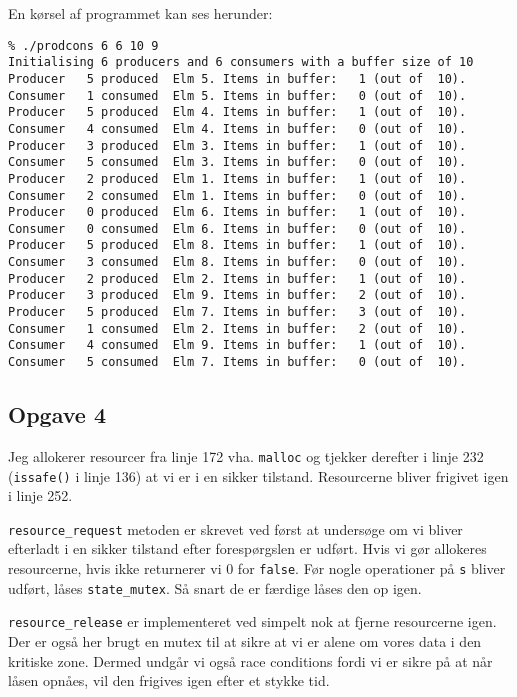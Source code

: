 \documentclass{article}
\begin{document}
En kørsel af programmet kan ses herunder:
\begin{verbatim}
% ./prodcons 6 6 10 9 
Initialising 6 producers and 6 consumers with a buffer size of 10
Producer   5 produced  Elm 5. Items in buffer:   1 (out of  10).
Consumer   1 consumed  Elm 5. Items in buffer:   0 (out of  10).
Producer   5 produced  Elm 4. Items in buffer:   1 (out of  10).
Consumer   4 consumed  Elm 4. Items in buffer:   0 (out of  10).
Producer   3 produced  Elm 3. Items in buffer:   1 (out of  10).
Consumer   5 consumed  Elm 3. Items in buffer:   0 (out of  10).
Producer   2 produced  Elm 1. Items in buffer:   1 (out of  10).
Consumer   2 consumed  Elm 1. Items in buffer:   0 (out of  10).
Producer   0 produced  Elm 6. Items in buffer:   1 (out of  10).
Consumer   0 consumed  Elm 6. Items in buffer:   0 (out of  10).
Producer   5 produced  Elm 8. Items in buffer:   1 (out of  10).
Consumer   3 consumed  Elm 8. Items in buffer:   0 (out of  10).
Producer   2 produced  Elm 2. Items in buffer:   1 (out of  10).
Producer   3 produced  Elm 9. Items in buffer:   2 (out of  10).
Producer   5 produced  Elm 7. Items in buffer:   3 (out of  10).
Consumer   1 consumed  Elm 2. Items in buffer:   2 (out of  10).
Consumer   4 consumed  Elm 9. Items in buffer:   1 (out of  10).
Consumer   5 consumed  Elm 7. Items in buffer:   0 (out of  10).
\end{verbatim}

\subsection*{Opgave 4}
Jeg allokerer resourcer fra linje 172 vha. \texttt{malloc} og tjekker derefter i linje 232 (\texttt{issafe()} i linje 136) at vi er i en sikker tilstand. Resourcerne bliver frigivet igen i linje 252.

\texttt{resource\_request} metoden er skrevet ved først at undersøge om vi bliver efterladt i en sikker tilstand efter forespørgslen er udført. Hvis vi gør allokeres resourcerne, hvis ikke returnerer vi 0 for 
\texttt{false}. Før nogle operationer på \texttt{s} bliver udført, låses \texttt{state\_mutex}. Så snart de er færdige låses den op igen.

\texttt{resource\_release} er implementeret ved simpelt nok at fjerne resourcerne igen. Der er også her brugt en mutex til at sikre at vi er alene om vores data i den kritiske zone. Dermed undgår vi også race conditions fordi vi er sikre på at når låsen opnåes, vil den frigives igen efter et stykke tid.
\end{document}
